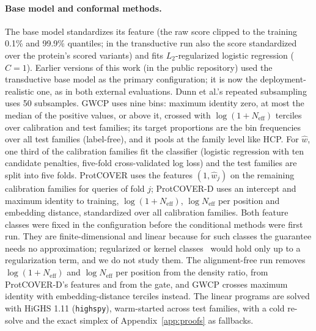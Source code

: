 \paragraph{Base model and conformal methods.} The base model standardizes its feature (the raw score clipped to the training 0.1\% and 99.9\% quantiles; in the transductive run also the score standardized over the protein's scored variants) and fits $L_2$-regularized logistic regression ($C=1$). Earlier versions of this work (in the public repository) used the transductive base model as the primary configuration; it is now the deployment-realistic one, as in both external evaluations. Dunn et al.'s repeated subsampling uses 50 subsamples. GWCP uses nine bins: maximum identity zero, at most the median of the positive values, or above it, crossed with $\log(1+N_{\mathrm{eff}})$ terciles over calibration and test families; its target proportions are the bin frequencies over all test families (label-free), and it pools at the family level like HCP. For $\hat w$, one third of the calibration families fit the classifier (logistic regression with ten candidate penalties, five-fold cross-validated log loss) and the test families are split into five folds. ProtCOVER uses the features $(1,\hat w_j)$ on the remaining calibration families for queries of fold $j$; ProtCOVER-D uses an intercept and maximum identity to training, $\log(1+N_{\mathrm{eff}})$, $\log N_{\mathrm{eff}}$ per position and embedding distance, standardized over all calibration families. Both feature classes were fixed in the configuration before the conditional methods were first run. They are finite-dimensional and linear because for such classes the guarantee needs no approximation; regularized or kernel classes~\cite{gibbs2025conformal} would hold only up to a regularization term, and we do not study them. The alignment-free run removes $\log(1+N_{\mathrm{eff}})$ and $\log N_{\mathrm{eff}}$ per position from the density ratio, from ProtCOVER-D's features and from the gate, and GWCP crosses maximum identity with embedding-distance terciles instead. The linear programs are solved with HiGHS 1.11 (\texttt{highspy}), warm-started across test families, with a cold re-solve and the exact simplex of Appendix~\ref{app:proofs} as fallbacks.

